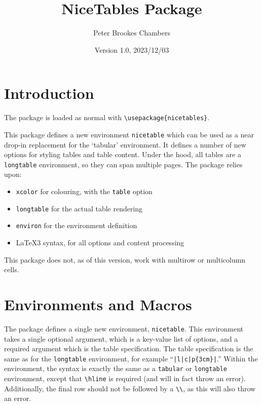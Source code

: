 \documentclass{article}
\title{NiceTables Package}
\author{Peter Brookes Chambers}
\date{Version 1.0, 2023/12/03}
\newcommand{\semibold}[1]{{\firabook #1}}
\newcommand{\emphasis}[1]{{\color{Red}\semibold{#1}}}
\begin{document}
\maketitle

\tableofcontents

\clearpage

\section{Introduction}

The package is loaded as normal with \verb|\usepackage{nicetables}|.

This package defines a new environment \texttt{nicetable} which can be used as a near drop-in replacement for the `tabular' environment. It defines a number of new options for styling tables and table content. Under the hood, all tables are a \texttt{longtable} environment, so they can span multiple pages. The package relies upon:
\begin{itemize}
    \item \texttt{xcolor} for colouring, with the \texttt{table} option
    \item \texttt{longtable} for the actual table rendering
    \item \texttt{environ} for the environment definition
    \item \LaTeX3 syntax, for all options and content processing
\end{itemize}

\emphasis{Note:} This package does not, as of this version, work with multirow or multicolumn cells.

\section{Environments and Macros}

The package defines a single new environment, \texttt{nicetable}. This environment takes a single optional argument, which is a key-value list of options, and a required argument which is the table specification. The table specification is the same as for the \texttt{longtable} environment, for example ``\verb!|l|c|p{3cm}|!.'' Within the environment, the syntax is exactly the same as a \texttt{tabular} or \texttt{longtable} environment, except that \verb|\hline| is \emphasis{never} required (and will in fact throw an error). Additionally, the final row should not be followed by a \verb|\\|, as this will also throw an error.
\end{document}
